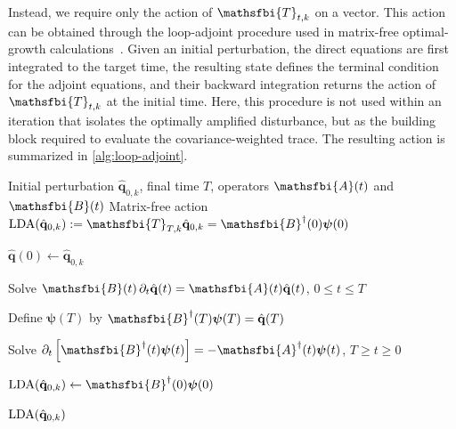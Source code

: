 Instead, we require only the action of \(\mathsfbi{T}_{t,k}\) on a vector. This action can be obtained through the loop-adjoint procedure used in matrix-free optimal-growth calculations~\citep{luchini-2000,luchini-bottaro-2014,barkeley-blackburn-sherwin-2008}. Given an initial perturbation, the direct equations are first integrated to the target time, the resulting state defines the terminal condition for the adjoint equations, and their backward integration returns the action of \(\mathsfbi{T}_{t,k}\) at the initial time. Here, this procedure is not used within an iteration that isolates the optimally amplified disturbance, but as the building block required to evaluate the covariance-weighted trace. The resulting action is summarized in \cref{alg:loop-adjoint}.
\begin{algorithm}[H]
  \caption{Matrix-free loop-direct-adjoint (LDA) action of \(\mathsfbi{T}_{T,k}\)}
  \label{alg:loop-adjoint}

  \begin{algorithmic}[1]
    \Require Initial perturbation \(\hat{\mathbf{q}}_{0,k}\), final time \(T\),
             operators \(\mathsfbi{A}(t)\) and \(\mathsfbi{B}(t)\)
    \Ensure Matrix-free action
      \(\LDA(\hat{\mathbf{q}}_{0,k})
      :=
      \mathsfbi{T}_{T,k}\hat{\mathbf{q}}_{0,k}
      =
      \mathsfbi{B}^{\dagger}(0)\boldsymbol{\psi}(0)\)

    \State \(\hat{\mathbf{q}}(0)\gets\hat{\mathbf{q}}_{0,k}\)

    \State Solve
      \(\mathsfbi{B}(t)\,\partial_t\hat{\mathbf{q}}(t)
      =
      \mathsfbi{A}(t)\hat{\mathbf{q}}(t)\),
      \(0\leq t\leq T\)

    \State Define \(\boldsymbol{\psi}(T)\) by
      \(\mathsfbi{B}^{\dagger}(T)\boldsymbol{\psi}(T)
      =
      \hat{\mathbf{q}}(T)\)

    \State Solve
      \(\partial_t
      \left[
        \mathsfbi{B}^{\dagger}(t)\boldsymbol{\psi}(t)
      \right]
      =
      -\mathsfbi{A}^{\dagger}(t)\boldsymbol{\psi}(t)\),
      \(T\geq t\geq 0\)

    \State \(\LDA(\hat{\mathbf{q}}_{0,k})
      \gets
      \mathsfbi{B}^{\dagger}(0)\boldsymbol{\psi}(0)\)

    \State \Return \(\operatorname{LDA}(\hat{\mathbf{q}}_{0,k})\)
  \end{algorithmic}
\end{algorithm}

